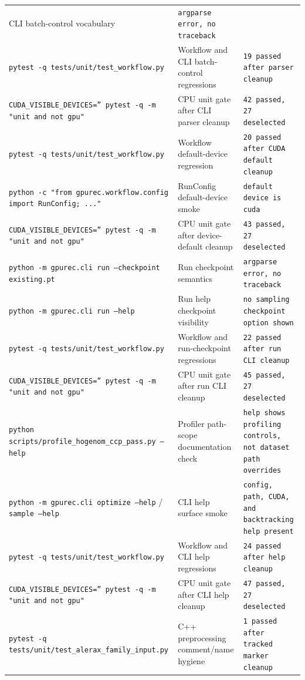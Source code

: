 \documentclass[11pt]{article}
\begin{document}
\begin{center}
\begin{tabular}{lll}
CLI batch-control vocabulary &
\texttt{argparse error, no traceback} \\
\texttt{pytest -q tests/unit/test\_workflow.py} &
Workflow and CLI batch-control regressions &
\texttt{19 passed after parser cleanup} \\
\texttt{CUDA\_VISIBLE\_DEVICES='' pytest -q -m "unit and not gpu"} &
CPU unit gate after CLI parser cleanup &
\texttt{42 passed, 27 deselected} \\
\texttt{pytest -q tests/unit/test\_workflow.py} &
Workflow default-device regression &
\texttt{20 passed after CUDA default cleanup} \\
\texttt{python -c "from gpurec.workflow.config import RunConfig; ..."} &
RunConfig default-device smoke &
\texttt{default device is cuda} \\
\texttt{CUDA\_VISIBLE\_DEVICES='' pytest -q -m "unit and not gpu"} &
CPU unit gate after device-default cleanup &
\texttt{43 passed, 27 deselected} \\
\texttt{python -m gpurec.cli run --checkpoint existing.pt} &
Run checkpoint semantics &
\texttt{argparse error, no traceback} \\
\texttt{python -m gpurec.cli run --help} &
Run help checkpoint visibility &
\texttt{no sampling checkpoint option shown} \\
\texttt{pytest -q tests/unit/test\_workflow.py} &
Workflow and run-checkpoint regressions &
\texttt{22 passed after run CLI cleanup} \\
\texttt{CUDA\_VISIBLE\_DEVICES='' pytest -q -m "unit and not gpu"} &
CPU unit gate after run CLI cleanup &
\texttt{45 passed, 27 deselected} \\
\texttt{python scripts/profile\_hogenom\_ccp\_pass.py --help} &
Profiler path-scope documentation check &
\texttt{help shows profiling controls, not dataset path overrides} \\
\texttt{python -m gpurec.cli optimize --help} / \texttt{sample --help} &
CLI help surface smoke &
\texttt{config, path, CUDA, and backtracking help present} \\
\texttt{pytest -q tests/unit/test\_workflow.py} &
Workflow and CLI help regressions &
\texttt{24 passed after help cleanup} \\
\texttt{CUDA\_VISIBLE\_DEVICES='' pytest -q -m "unit and not gpu"} &
CPU unit gate after CLI help cleanup &
\texttt{47 passed, 27 deselected} \\
\texttt{pytest -q tests/unit/test\_alerax\_family\_input.py} &
C++ preprocessing comment/name hygiene &
\texttt{1 passed after tracked marker cleanup} \\

\end{tabular}
\end{center}
\end{document}
